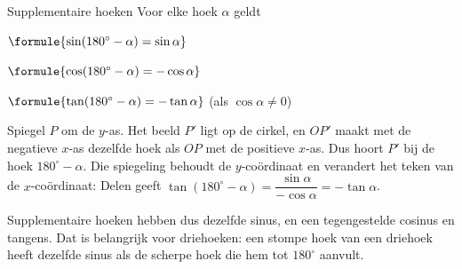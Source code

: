 \begin{theorie}
\begin{minipage}[t]{.64\linewidth}
\vspace{0pt}
\begin{stelling}{Supplementaire hoeken}
Voor elke hoek $\alpha$ geldt

\vspace{1mm}
\qquad $\formule{\sin(180^\circ - \alpha) = \sin\alpha}$

\qquad $\formule{\cos(180^\circ - \alpha) = -\cos\alpha}$

\qquad $\formule{\tan(180^\circ - \alpha) = -\tan\alpha}$ \quad (als $\cos\alpha \neq 0$)
\end{stelling}

\begin{bewijs}
Spiegel $P$ om de $y$-as. Het beeld $P'$ ligt op de cirkel, en $OP'$ maakt met de negatieve $x$-as dezelfde hoek als $OP$ met de positieve $x$-as. Dus hoort $P'$ bij de hoek $180^\circ - \alpha$. Die spiegeling behoudt de $y$-coördinaat en verandert het teken van de $x$-coördinaat:
Delen geeft $\tan(180^\circ - \alpha) = \dfrac{\sin\alpha}{-\cos\alpha} = -\tan\alpha$.
\end{bewijs}
\end{minipage}\hfill
\begin{minipage}[t]{.32\linewidth}
\vspace{3mm}
\centering
{}
\end{minipage}
\end{theorie}

Supplementaire hoeken hebben dus dezelfde sinus, en een tegengestelde cosinus en tangens. Dat is belangrijk voor driehoeken: een stompe hoek van een driehoek heeft dezelfde sinus als de scherpe hoek die hem tot $180^\circ$ aanvult.

